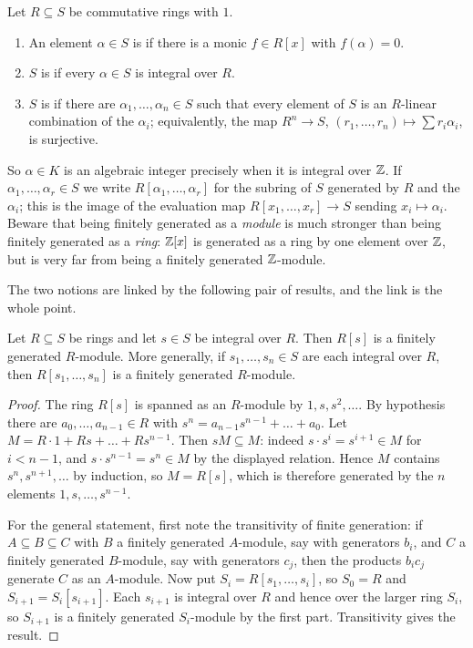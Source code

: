 \documentclass[a4paper]{scrartcl}
\begin{document}
\begin{definition}[Integral]
	Let $R \subseteq S$ be commutative rings with $1$.
	\begin{enumerate}[label=(\roman*)]
		\item An element $\alpha \in S$ is  if there is a monic $f \in R[x]$ with $f(\alpha) = 0$.
		\item $S$ is  if every $\alpha \in S$ is integral over $R$.
		\item $S$ is  if there are $\alpha_1, \dots, \alpha_n \in S$ such that every element of $S$ is an $R$-linear combination of the $\alpha_i$; equivalently, the map $R^n \to S$, $(r_1,\dots,r_n) \mapsto \sum r_i\alpha_i$, is surjective.
	\end{enumerate}
\end{definition}

So $\alpha \in K$ is an algebraic integer precisely when it is integral over $\mathbb{Z}$. If $\alpha_1, \dots, \alpha_r \in S$ we write $R[\alpha_1, \dots, \alpha_r]$ for the subring of $S$ generated by $R$ and the $\alpha_i$; this is the image of the evaluation map $R[x_1,\dots,x_r] \to S$ sending $x_i \mapsto \alpha_i$. Beware that being finitely generated as a \emph{module} is much stronger than being finitely generated as a \emph{ring}: $\mathbb{Z}[x]$ is generated as a ring by one element over $\mathbb{Z}$, but is very far from being a finitely generated $\mathbb{Z}$-module.

The two notions are linked by the following pair of results, and the link is the whole point.

\begin{proposition}\label{prop:intfg}
	Let $R \subseteq S$ be rings and let $s \in S$ be integral over $R$. Then $R[s]$ is a finitely generated $R$-module. More generally, if $s_1, \dots, s_n \in S$ are each integral over $R$, then $R[s_1, \dots, s_n]$ is a finitely generated $R$-module.
\end{proposition}

\begin{proof}
	The ring $R[s]$ is spanned as an $R$-module by $1, s, s^2, \dots$. By hypothesis there are $a_0, \dots, a_{n-1} \in R$ with $s^n = a_{n-1}s^{n-1} + \dots + a_0$. Let $M = R \cdot 1 + Rs + \dots + Rs^{n-1}$. Then $sM \subseteq M$: indeed $s \cdot s^i = s^{i+1} \in M$ for $i < n-1$, and $s\cdot s^{n-1} = s^n \in M$ by the displayed relation. Hence $M$ contains $s^n, s^{n+1}, \dots$ by induction, so $M = R[s]$, which is therefore generated by the $n$ elements $1, s, \dots, s^{n-1}$.

	For the general statement, first note the transitivity of finite generation: if $A \subseteq B \subseteq C$ with $B$ a finitely generated $A$-module, say with generators $b_i$, and $C$ a finitely generated $B$-module, say with generators $c_j$, then the products $b_ic_j$ generate $C$ as an $A$-module. Now put $S_i = R[s_1,\dots,s_i]$, so $S_0 = R$ and $S_{i+1} = S_i[s_{i+1}]$. Each $s_{i+1}$ is integral over $R$ and hence over the larger ring $S_i$, so $S_{i+1}$ is a finitely generated $S_i$-module by the first part. Transitivity gives the result.
\end{proof}
\end{document}
